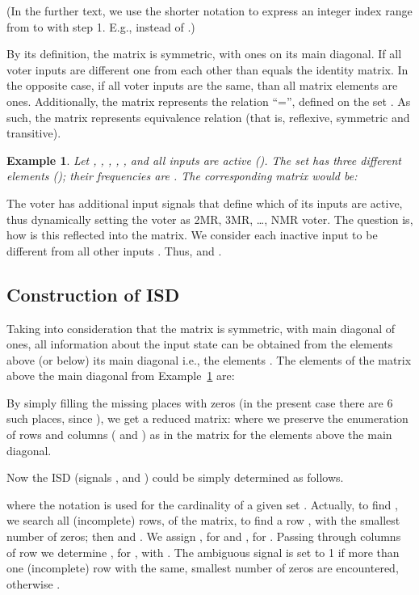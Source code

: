 \documentclass[technote, a4paper, onecolumn]{IEEEtran}  \newcommand{\avtor}{Aleksandar Simevski}
\newtheorem{ex}{Example}
\begin{document}
(In the further text, we use the shorter notation  to express an integer index range from  to  with step 1. E.g.,  instead of .)

By  its definition, the matrix  is symmetric, with ones on its main diagonal.  If all voter inputs are different one from each other than  equals the identity matrix. In the opposite case, if all voter inputs are the same, than all matrix elements are ones. Additionally, the matrix  represents the relation ``='', defined on the set . As such, the matrix  represents equivalence  relation (that is, reflexive, symmetric and transitive).

\medskip
\begin{ex}\label{ex_matrix_build}
Let , , , , , and all inputs are  active (). The set  has three different elements (); their frequencies are . The corresponding matrix would be: 
\end{ex}

\medskip

The voter has additional  input signals that define which of its inputs  are active, thus dynamically setting the voter as 2MR, 3MR, \dots, NMR voter. The question is, how is this reflected into the  matrix. We consider each inactive input  to be different from all other inputs . Thus,  and .

\subsection{Construction of ISD}\label{subsec_isd}

Taking into consideration that the matrix  is symmetric, with main diagonal of ones, all information about the input state can be obtained from the elements above (or below) its main diagonal  i.e., the elements . The elements of the matrix above the main diagonal from Example~\ref{ex_matrix_build} are: 

By simply filling the missing  places with zeros (in the present case there are 6 such places, since ), we get a reduced  matrix:  where we preserve the enumeration of rows and columns ( and ) as in the  matrix for the elements above the main diagonal.

Now the ISD (signals ,  and ) could be simply determined as follows.

where the notation  is used for the cardinality of a given set . Actually, to find , we search all (incomplete) rows,  of the  matrix, to find a row , with the smallest number of zeros; then  and . We assign ,  for  and , for . Passing through columns  of row  we determine , for , with . The ambiguous signal   is set to 1 if more than one (incomplete) row with the same, smallest number of zeros are encountered, otherwise .
\end{document}
